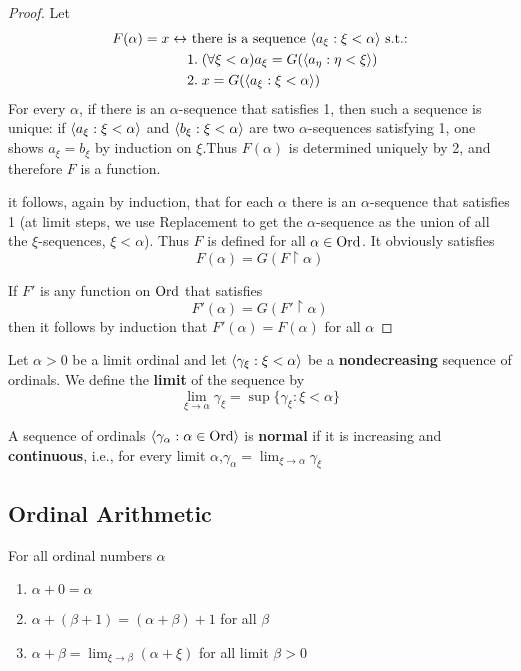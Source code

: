 \documentclass[11pt]{article}
\begin{document}
\begin{proof}
Let
\begin{align}
\label{2.6}
F(\alpha)=x\leftrightarrow&\text{ there is a sequence }\langle a_\xi:\xi<\alpha\rangle\text{ s.t.:}\\
&1.\; (\forall\xi<\alpha)a_\xi=G(\langle a_\eta:\eta<\xi\rangle)\nonumber\\
&2.\; x=G(\langle a_\xi:\xi<\alpha\rangle)\nonumber
\end{align}
For every \(\alpha\), if there is an \(\alpha\)-sequence that satisfies 1, then such a sequence is unique:
if \(\langle a_\xi:\xi<\alpha\rangle\) and \(\langle b_\xi:\xi<\alpha\rangle\) are two \(\alpha\)-sequences satisfying 1, one shows \(a_\xi=b_\xi\) by
induction on \(\xi\).Thus \(F(\alpha)\) is determined uniquely by 2, and therefore \(F\) is a function.

it follows, again by induction, that for each \(\alpha\) there is an \(\alpha\)-sequence that satisfies 1 (at
limit steps, we use Replacement to get the \(\alpha\)-sequence as the union of all the
\(\xi\)-sequences, \(\xi<\alpha\)). Thus \(F\) is defined for all \(\alpha\in\text{Ord}\). It obviously satisfies
\begin{equation*}
F(\alpha)=G(F\restriction\alpha)
\end{equation*}

If \(F'\) is any function on \(\text{Ord}\) that satisfies
\begin{equation*}
F'(\alpha)=G(F'\restriction\alpha)
\end{equation*}
then it follows by induction that \(F'(\alpha)=F(\alpha)\) for all \(\alpha\)
\end{proof}

\begin{definition}[]
Let \(\alpha>0\) be a limit ordinal and let \(\langle\gamma_\xi:\xi<\alpha\rangle\) be a \textbf{nondecreasing} sequence of ordinals.
We define the \textbf{limit} of the sequence by
\begin{equation*}
\lim_{\xi\to\alpha}\gamma_\xi=\sup\{\gamma_\xi:\xi<\alpha\}
\end{equation*}

A sequence of ordinals \(\langle\gamma_\alpha:\alpha\in\text{Ord}\rangle\) is \textbf{normal} if it is increasing and \textbf{continuous}, i.e., for
every limit \(\alpha\),\(\gamma_\alpha=\lim_{\xi\to\alpha}\gamma_\xi\)
\end{definition}

\subsection{Ordinal Arithmetic}
\label{sec:orgfa73516}
\begin{definition}[Addition]
For all ordinal numbers \(\alpha\)
\begin{enumerate}
\item \(\alpha+0=\alpha\)
\item \(\alpha+(\beta+1)=(\alpha+\beta)+1\) for all \(\beta\)
\item \(\alpha+\beta=\lim_{\xi\to\beta}(\alpha+\xi)\) for all limit \(\beta>0\)
\end{enumerate}
\end{definition}
\end{document}
